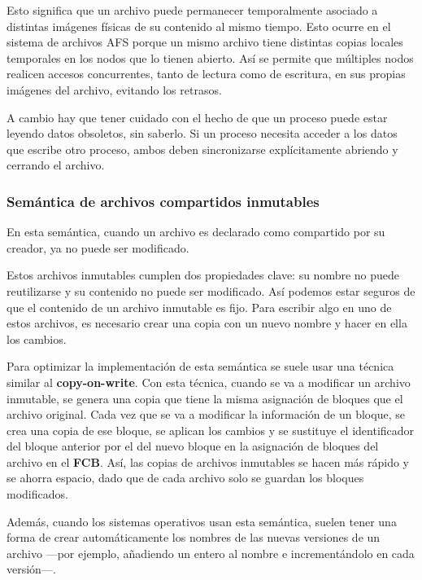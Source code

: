 Esto significa que un archivo puede permanecer temporalmente asociado a
distintas imágenes físicas de su contenido al mismo tiempo. Esto ocurre
en el sistema de archivos AFS porque un mismo archivo tiene distintas
copias locales temporales en los nodos que lo tienen abierto. Así se
permite que múltiples nodos realicen accesos concurrentes, tanto de
lectura como de escritura, en sus propias imágenes del archivo, evitando
los retrasos.

A cambio hay que tener cuidado con el hecho de que un proceso puede
estar leyendo datos obsoletos, sin saberlo. Si un proceso necesita
acceder a los datos que escribe otro proceso, ambos deben sincronizarse
explícitamente abriendo y cerrando el archivo.

\subsubsection{Semántica de archivos compartidos
inmutables}\label{_semuxe1ntica_de_archivos_compartidos_inmutables}

{} En esta semántica, cuando un archivo es declarado como compartido por
su creador, ya no puede ser modificado.

Estos archivos inmutables cumplen dos propiedades clave: su nombre no
puede reutilizarse y su contenido no puede ser modificado. Así podemos
estar seguros de que el contenido de un archivo inmutable es fijo. Para
escribir algo en uno de estos archivos, es necesario crear una copia con
un nuevo nombre y hacer en ella los cambios.

Para optimizar la implementación de esta semántica se suele usar una
técnica similar al \textbf{copy-on-write}. Con esta técnica, cuando se
va a modificar un archivo inmutable, se genera una copia que tiene la
misma asignación de bloques que el archivo original. Cada vez que se va
a modificar la información de un bloque, se crea una copia de ese
bloque, se aplican los cambios y se sustituye el identificador del
bloque anterior por el del nuevo bloque en la asignación de bloques del
archivo en el \textbf{FCB}. Así, las copias de archivos inmutables se
hacen más rápido y se ahorra espacio, dado que de cada archivo solo se
guardan los bloques modificados.

Además, cuando los sistemas operativos usan esta semántica, suelen tener
una forma de crear automáticamente los nombres de las nuevas versiones
de un archivo ---por ejemplo, añadiendo un entero al nombre e
incrementándolo en cada versión---.

